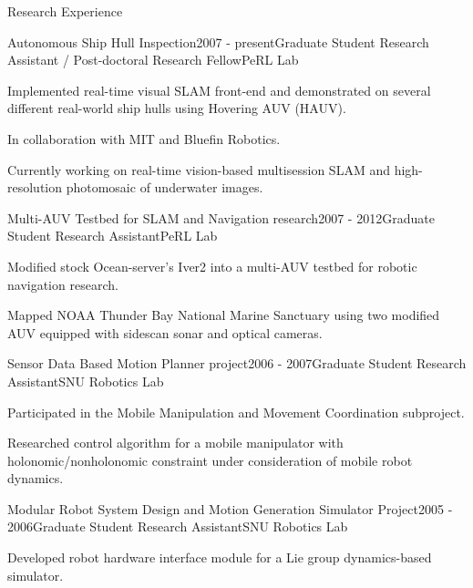 \begin{rSection}{Research Experience}

\begin{rSubsection}{Autonomous Ship Hull Inspection}{2007 - present}{Graduate Student Research Assistant / Post-doctoral Research Fellow}{PeRL Lab}
  \item Implemented real-time visual SLAM front-end and demonstrated on several different real-world ship hulls using Hovering AUV (HAUV).
  \item In collaboration with \ac{MIT} and Bluefin Robotics.
  \item Currently working on real-time vision-based multisession SLAM and high-resolution photomosaic of underwater images.
\end{rSubsection}

\begin{rSubsection}{Multi-AUV Testbed for SLAM and Navigation research}{2007 - 2012}{Graduate Student Research Assistant}{PeRL Lab}
  \item Modified stock Ocean-server's Iver2 into a multi-AUV testbed for robotic navigation research.
  \item Mapped \ac{NOAA} Thunder Bay National Marine Sanctuary using two modified \ac{AUV} equipped with sidescan sonar and optical cameras.
\end{rSubsection}

\begin{rSubsection}{Sensor Data Based Motion Planner project}{2006 - 2007}{Graduate Student Research Assistant}{SNU Robotics Lab}
  \item Participated in the Mobile Manipulation and Movement Coordination subproject.
  \item Researched control algorithm for a mobile manipulator with holonomic/nonholonomic constraint under consideration of mobile robot dynamics.
\end{rSubsection}

\begin{rSubsection}{Modular Robot System Design and Motion Generation Simulator Project}{2005 - 2006}{Graduate Student Research Assistant}{SNU Robotics Lab}
  \item Developed robot hardware interface module for a Lie group dynamics-based simulator.
\end{rSubsection}

\end{rSection}


